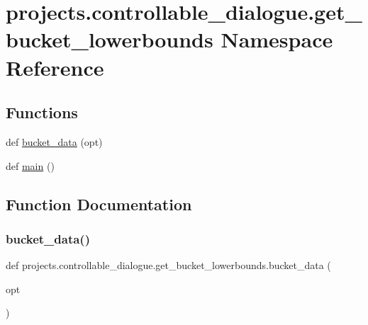 \hypertarget{namespaceprojects_1_1controllable__dialogue_1_1get__bucket__lowerbounds}{}\section{projects.\+controllable\+\_\+dialogue.\+get\+\_\+bucket\+\_\+lowerbounds Namespace Reference}
\label{namespaceprojects_1_1controllable__dialogue_1_1get__bucket__lowerbounds}
\subsection*{Functions}
\begin{DoxyCompactItemize}
\item 
def \hyperlink{namespaceprojects_1_1controllable__dialogue_1_1get__bucket__lowerbounds_aeba9a3a9932797d722c5ff9d0991a87e}{bucket\+\_\+data} (opt)
\item 
def \hyperlink{namespaceprojects_1_1controllable__dialogue_1_1get__bucket__lowerbounds_a872417720ce8a3ff988a11d934afbda8}{main} ()
\end{DoxyCompactItemize}


\subsection{Function Documentation}
\mbox{\label{namespaceprojects_1_1controllable__dialogue_1_1get__bucket__lowerbounds_aeba9a3a9932797d722c5ff9d0991a87e}} 
\subsubsection{\texorpdfstring{bucket\+\_\+data()}{bucket\_data()}}
{\footnotesize\ttfamily def projects.\+controllable\+\_\+dialogue.\+get\+\_\+bucket\+\_\+lowerbounds.\+bucket\+\_\+data (\begin{DoxyParamCaption}\item[{}]{opt }\end{DoxyParamCaption})}

